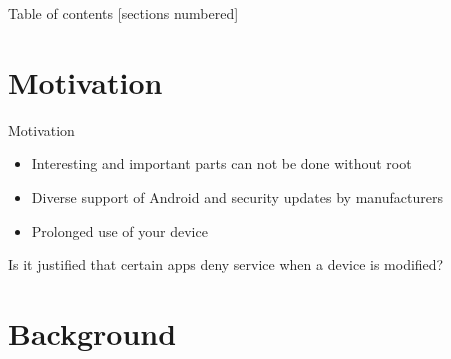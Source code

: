 \documentclass[
    11pt,%
    aspectratio=169,%
]{beamer}
\title{\docTitle{}}
\subtitle{\docSubTitle{}}
\date{\docDate{}}
\author{\docAuthor{}}
\institute{\docInstitute{}}
\begin{document}
\maketitle
\begin{frame}{Table of contents}
  [sections numbered]
  \tableofcontents[hideallsubsections]
\end{frame}

%
%
\section{Motivation}
\begin{frame}[fragile]{Motivation}
\begin{itemize}
  \item Interesting and important parts can not be done without root\newline
  \item Diverse support of Android and security updates by manufacturers\newline
  \item Prolonged use of your device\newline
\end{itemize}
Is it justified that certain apps deny service when a device is modified?
\end{frame}



%
%
\section{Background}

%
\end{document}
